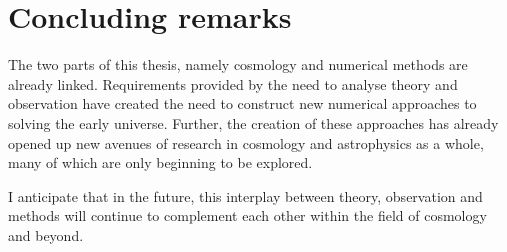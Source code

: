 \chapter*{Concluding remarks}

The two parts of this thesis, namely cosmology and numerical methods are already linked. Requirements provided by the need to analyse theory and observation have created the need to construct new numerical approaches to solving the early universe. Further, the creation of these approaches has already opened up new avenues of research in cosmology and astrophysics as a whole, many of which are only beginning to be explored.

I anticipate that in the future, this interplay between theory, observation and methods will continue to complement each other within the field of cosmology and beyond.


\cleardoublepage{}
